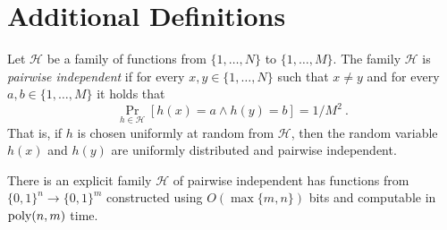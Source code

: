 \section{Additional Definitions}

\begin{definition}\label{def:pairwise}
Let $\mathcal{H}$ be a family of functions from $\{1,\ldots, N\}$ to $\{1,\ldots, M\}$. The family $\mathcal{H}$ is \emph{pairwise independent} if for every $x,y \in \{1,\ldots, N\}$ such that $x \neq y$ and for every $a,b \in \{1,\ldots, M\}$ it holds that 
$$\Pr_{h \in \mathcal{H}}[h(x)=a \wedge h(y)=b]=1/M^2~.$$
That is, if $h$ is chosen uniformly at random from $\mathcal{H}$, then the random variable $h(x)$ and $h(y)$ are uniformly distributed and pairwise independent. 
\end{definition}

\begin{fact}\label{fc:pairwise}\cite{TCS-010}
There is an explicit family $\mathcal{H}$ of pairwise independent has functions from $\{0,1\}^n \to \{0,1\}^m$ constructed using $O(\max\{
m,n\})$ bits and computable in $\operatorname{\text{{\rm poly}}}(n,m)$ time.
\end{fact}